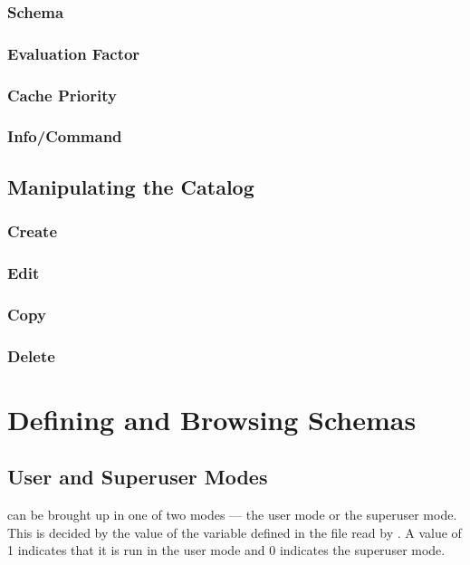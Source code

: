 \subsubsection{Schema}
\subsubsection{Evaluation Factor}
\subsubsection{Cache Priority}
\subsubsection{Info/Command}

\subsection{Manipulating the Catalog}

\subsubsection{Create}
\subsubsection{Edit}
\subsubsection{Copy}
\subsubsection{Delete}

\section{Defining and Browsing Schemas}

\subsection{User and Superuser Modes}

\Devise can be brought up in one of two modes --- the user mode or the
superuser mode.  This is decided by the value of the variable
 defined in the  file read by
\Devise.  A value of 1 indicates that it is run in the user mode and 0
indicates the superuser mode.

